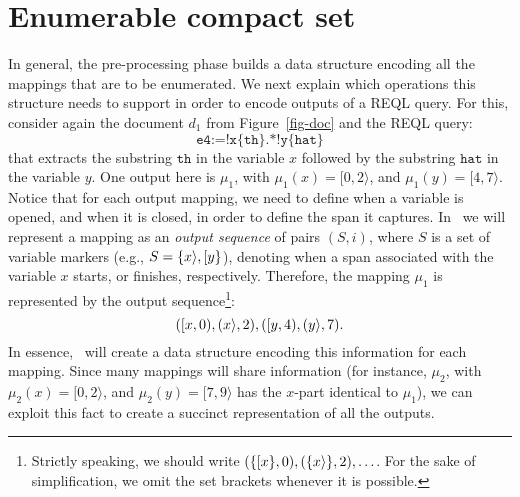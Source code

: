 \section{Enumerable compact set} 
In general, the pre-processing phase builds a  data structure encoding all the mappings that are to be enumerated. We next explain which operations this structure needs to support in order to encode outputs of a REQL query. For this, consider again the document $d_1$ from Figure~\ref{fig-doc} and the REQL query:
$$
\texttt{e4} := \texttt{!x\{th\}.*!y\{hat\}}
$$
%			
that extracts the substring $\texttt{th}$ in the variable $x$ followed by the substring $\texttt{hat}$ in the variable $y$.
One output here is $\mu_1$, with $\mu_1(x) = [0,2\rangle$, and $\mu_1(y) = [4,7\rangle$. Notice that for each output mapping, we need to define when a variable is opened, and when it is closed, in order to define the span it captures. In \rematch\ we will represent a mapping as an \emph{output sequence} of pairs $(S,i)$, where $S$ is a set of variable markers (e.g., $S=\{x \rangle, [ y\}$), denoting when a span associated with the variable $x$ starts, or finishes, respectively. Therefore, the mapping $\mu_1$ is represented by the output sequence\footnote{Strictly speaking, we should write $(\{[ x\},0),(\{x \rangle\},2),\ldots$. For the sake of simplification, we omit the set brackets whenever it is possible.}:
$$
([ x,0),(x \rangle,2),([ y,4),(y \rangle,7).
$$
In essence, \rematch\ will create a data structure encoding this information for each mapping. Since many mappings will share information (for instance, $\mu_2$, with $\mu_2(x)=[0,2\rangle$, and $\mu_2(y)=[7,9\rangle$ has the $x$-part identical to $\mu_1$), we can exploit this fact to create a succinct representation of all the outputs.

